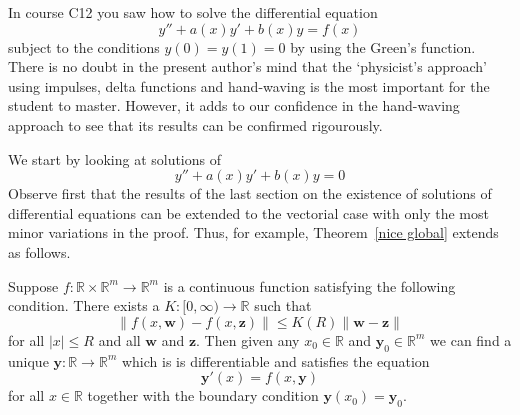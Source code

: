In course C12 you saw how to solve the differential
equation
\begin{equation*}
y''+a(x)y'+b(x)y=f(x) \tag*{$(*)$}
\end{equation*}
subject to the conditions $y(0)=y(1)=0$ by using the
Green's function. There is no doubt in the present
author's mind that the `physicist's approach'
using impulses, delta functions and hand-waving
is the most important for the student to master.
However, it adds to our confidence in the hand-waving
approach to see that its results can be confirmed
rigourously.

We start by looking at solutions of
\begin{equation*}
y''+a(x)y'+b(x)y=0 \tag*{$(**)$}
\end{equation*}
Observe first that the results of the last section
on the existence of solutions of differential
equations can be extended to the vectorial case
with only the most minor variations in the proof.
Thus, for example, Theorem~\ref{nice global}
extends as follows.
\begin{theorem}\label{nice global many}
Suppose $f:{\mathbb R}\times{\mathbb R}^{m}
\rightarrow{\mathbb R}^{m}$
is a continuous function satisfying the following condition.
There exists a $K:[0,\infty)\rightarrow{\mathbb R}$
such that
\[\|f(x,{\mathbf w})-f(x,{\mathbf z})\|
\leq K(R) \|{\mathbf w}-{\mathbf z}\| \]
for all $|x|\leq R$
and all $\mathbf{w}$ and $\mathbf{z}$.
Then given any $x_{0}\in{\mathbb R}$
and ${\mathbf y}_{0}\in{\mathbb R}^{m}$
we can
find a unique
$\mathbf{y}:{\mathbb R}\rightarrow{\mathbb R}^{m}$
which is
is differentiable and satisfies the equation 
\[{\mathbf y}'(x)=f(x,{\mathbf y})\]
for all $x\in {\mathbb R}$ together
with the boundary condition $\mathbf{y}(x_{0})=\mathbf{y}_{0}$.
\end{theorem}

